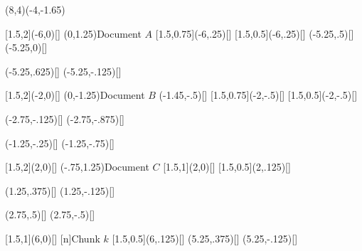 \documentclass{acm_proc_article-sp}
\begin{document}
\begin{figure*}[t]
\begin{center}

\begin{graph}(8,4)(-4,-1.65)
\opaquetextfalse

[1.5,2](-6,0)[\fillednodesfalse]     
(0,1.25){Document $A$}
[1.5,0.75](-6,.25)[]  
[1.5,0.5](-6,.25)[]
(-5.25,.5)[]
(-5.25,0)[]

(-5.25,.625)[]
(-5.25,-.125)[]


[1.5,2](-2,0)[\fillednodesfalse]
(0,-1.25){Document $B$}
(-1.45,-.5)[]
[1.5,0.75](-2,-.5)[]
[1.5,0.5](-2,-.5)[]

(-2.75,-.125)[]
(-2.75,-.875)[]

(-1.25,-.25)[]
(-1.25,-.75)[]


[1.5,2](2,0)[\fillednodesfalse]      
(-.75,1.25){Document $C$}
[1.5,1](2,0)[]
[1.5,0.5](2,.125)[]

(1.25,.375)[]
(1.25,-.125)[]

(2.75,.5)[]
(2.75,-.5)[]



[1.5,1](6,0)[]      
[n]{Chunk $k$}
[1.5,0.5](6,.125)[]
(5.25,.375)[]
(5.25,-.125)[]


\end{graph}
\end{center}
\end{figure*}
\end{document}
